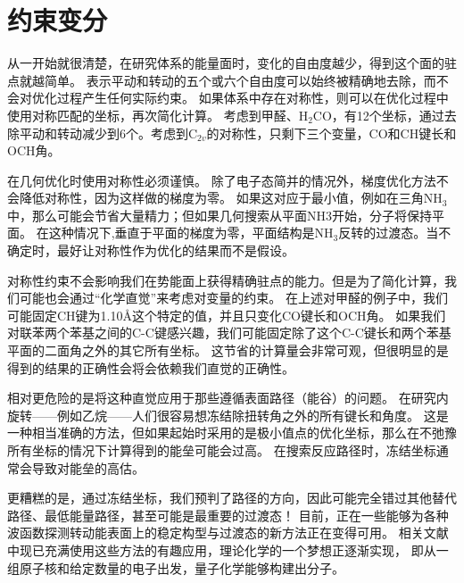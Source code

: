 \section{约束变分}
从一开始就很清楚，在研究体系的能量面时，变化的自由度越少，得到这个面的驻点就越简单。
表示平动和转动的五个或六个自由度可以始终被精确地去除，而不会对优化过程产生任何实际约束。
如果体系中存在对称性，则可以在优化过程中使用对称匹配的坐标，再次简化计算。
考虑到甲醛、H$_2$CO，有12个坐标，通过去除平动和转动减少到6个。考虑到C$_{2v}$的对称性，只剩下三个变量，CO和CH键长和OCH角。

在几何优化时使用对称性必须谨慎。
除了电子态简并的情况外，梯度优化方法不会降低对称性，因为这样做的梯度为零。
如果这对应于最小值，例如在三角NH$_3$中，那么可能会节省大量精力；但如果几何搜索从平面NH3开始，分子将保持平面。
在这种情况下,垂直于平面的梯度为零，平面结构是NH$_3$反转的过渡态。当不确定时，最好让对称性作为优化的结果而不是假设。

对称性约束不会影响我们在势能面上获得精确驻点的能力。但是为了简化计算，我们可能也会通过“化学直觉”来考虑对变量的约束。
在上述对甲醛的例子中，我们可能固定CH键为1.10\AA 这个特定的值，并且只变化CO键长和OCH角。
如果我们对联苯两个苯基之间的C-C键感兴趣，我们可能固定除了这个C-C键长和两个苯基平面的二面角之外的其它所有坐标。
这节省的计算量会非常可观，但很明显的是得到的结果的正确性会将会依赖我们直觉的正确性。

相对更危险的是将这种直觉应用于那些遵循表面路径（能谷）的问题。
在研究内旋转——例如乙烷——人们很容易想冻结除扭转角之外的所有键长和角度。
这是一种相当准确的方法，但如果起始时采用的是极小值点的优化坐标，那么在不弛豫所有坐标的情况下计算得到的能垒可能会过高。
在搜索反应路径时，冻结坐标通常会导致对能垒的高估。

更糟糕的是，通过冻结坐标，我们预判了路径的方向，因此可能完全错过其他替代路径、最低能量路径，甚至可能是最重要的过渡态！
目前，正在一些能够为各种波函数探测转动能表面上的稳定构型与过渡态的新方法正在变得可用。
相关文献中现已充满使用这些方法的有趣应用，理论化学的一个梦想正逐渐实现，
即从一组原子核和给定数量的电子出发，量子化学能够构建出分子。

\newpage
\theendnotes
{}
